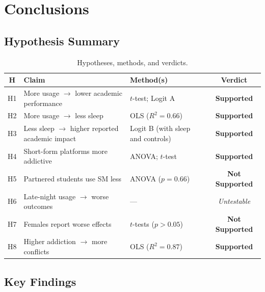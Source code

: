 \documentclass[10pt]{article}
\newcommand{\supported}{\textbf{Supported}}
\newcommand{\notsupported}{\textbf{Not Supported}}
\newcommand{\untestable}{\textit{Untestable}}
\begin{document}
\section{Conclusions}

\subsection{Hypothesis Summary}

\begin{table}[H]
\centering
\caption{Hypotheses, methods, and verdicts.}
\label{tab:summary}
\small
\begin{tabular}{@{} c p{5.4cm} p{3.5cm} c @{}}
\toprule
\textbf{H} & \textbf{Claim} & \textbf{Method(s)} & \textbf{Verdict} \\
\midrule
H1 & More usage $\to$ lower academic performance
   & $t$-test; Logit A & \supported \\
H2 & More usage $\to$ less sleep
   & OLS ($R^2=0.66$) & \supported \\
H3 & Less sleep $\to$ higher reported academic impact
   & Logit B (with sleep and controls) & \supported \\
H4 & Short-form platforms more addictive
   & ANOVA; $t$-test & \supported \\
H5 & Partnered students use SM less
   & ANOVA ($p=0.66$) & \notsupported \\
H6 & Late-night usage $\to$ worse outcomes
   & --- & \untestable \\
H7 & Females report worse effects
   & $t$-tests ($p>0.05$) & \notsupported \\
H8 & Higher addiction $\to$ more conflicts
   & OLS ($R^2=0.87$) & \supported \\
\bottomrule
\end{tabular}
\end{table}

\subsection{Key Findings}
\end{document}
